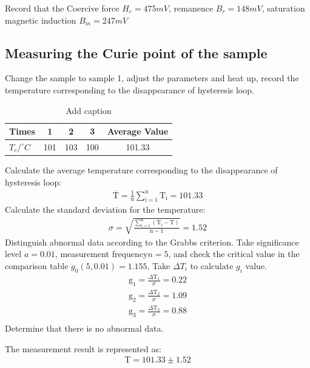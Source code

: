 \documentclass[UTF8]{article}
\begin{document}
   Record that the Coercive force $H_c = 475mV$, remanence $B_r = 148mV$, saturation magnetic induction $B_m = 247mV$
   
   \subsection{Measuring the Curie point of the sample}
  Change the sample to sample 1, adjust the parameters and heat up, record the temperature corresponding to the disappearance of hysteresis loop.
  \begin{table}[htbp]
    \centering
    \caption{Add caption}
      \begin{tabular}{lcccc}
      \toprule[2pt]
      Times & 1     & 2     & 3     & \multicolumn{1}{l}{Average Value} \\
      \midrule
      $T_c / ^{\circ}C $    & 101   & 103   & 100   & 101.33 \\
      \bottomrule[2pt]
      \end{tabular}%
    \label{tab:addlabel}%
  \end{table}%
  
  Calculate the average temperature corresponding to the disappearance of hysteresis loop:
  \begin{eqnarray}
  \overline{\mathrm{T}}=\frac{1}{\mathrm{n}} \sum_{\mathrm{i}=1}^{\mathrm{n}} \mathrm{T}_{\mathrm{i}}=101.33
  \end{eqnarray}
  Calculate the standard deviation for the temperature:
  \begin{eqnarray}
  \sigma=\sqrt{\frac{\sum_{\mathrm{i}=1}^{\mathrm{n}}\left(\mathrm{T}_{\mathrm{i}}-\mathrm{T}\right)}{\mathrm{n}-1}}=1.52
  \end{eqnarray}
  Distinguish abnormal data according to the Grabbs criterion. Take significance level $a=0.01$, measurement frequency$ n=5$, and check the critical value in the comparison table $g_0(5, 0.01)=1.155$, Take $\Delta T_i$ to calculate $g_i$ value.
  \begin{eqnarray}
  \mathrm{g}_{1}=\frac{\Delta \mathrm{T}_{1}}{\sigma}=0.22\\
  \mathrm{g}_{2}=\frac{\Delta \mathrm{T}_{2}}{\sigma}=1.09\\
  \mathrm{g}_{3}=\frac{\Delta \mathrm{T}_{3}}{\sigma}=0.88\\
  \end{eqnarray}
  Determine that there is no abnormal data.
  
  The measurement result is represented as:
  \begin{eqnarray}
  \mathrm{T}=101.33 \pm 1.52 
  \end{eqnarray}
\end{document}
